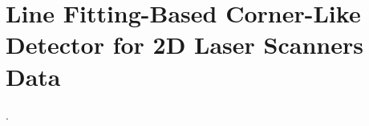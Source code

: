 \chapter{Line Fitting-Based Corner-Like Detector for 2D Laser Scanners Data}\label{appx:features}
\begin{description}[leftmargin=1cm,style=nextline,font=\normalfont]
\item[\cite{sousa:icara:2024}] .
\end{description}

\cleardoublepage


